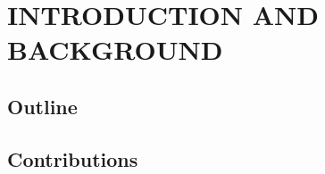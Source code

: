 \chapter{INTRODUCTION AND BACKGROUND}
\label{chap:intro}

\section{Outline}


\section{Contributions}

